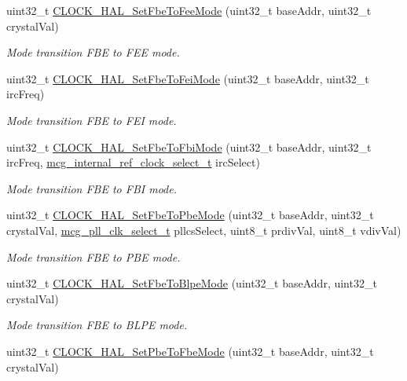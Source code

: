 \begin{DoxyCompactItemize}
uint32\+\_\+t \hyperlink{group__mcg__hal_gad92cb7d385dec217e4ec6f3ca8538fda}{C\+L\+O\+C\+K\+\_\+\+H\+A\+L\+\_\+\+Set\+Fbe\+To\+Fee\+Mode} (uint32\+\_\+t base\+Addr, uint32\+\_\+t crystal\+Val)
\begin{DoxyCompactList}\small\item\em Mode transition F\+BE to F\+EE mode. \end{DoxyCompactList}\item 
uint32\+\_\+t \hyperlink{group__mcg__hal_gaeb19584ea3baca6aef3b805ccc5485d1}{C\+L\+O\+C\+K\+\_\+\+H\+A\+L\+\_\+\+Set\+Fbe\+To\+Fei\+Mode} (uint32\+\_\+t base\+Addr, uint32\+\_\+t irc\+Freq)
\begin{DoxyCompactList}\small\item\em Mode transition F\+BE to F\+EI mode. \end{DoxyCompactList}\item 
uint32\+\_\+t \hyperlink{group__mcg__hal_ga26c8e4fcc5ae91b00683afe2cd6ac36e}{C\+L\+O\+C\+K\+\_\+\+H\+A\+L\+\_\+\+Set\+Fbe\+To\+Fbi\+Mode} (uint32\+\_\+t base\+Addr, uint32\+\_\+t irc\+Freq, \hyperlink{group__mcg__hal_ga9738d5cb312dacd7c75d2ed599ad48c7}{mcg\+\_\+internal\+\_\+ref\+\_\+clock\+\_\+select\+\_\+t} irc\+Select)
\begin{DoxyCompactList}\small\item\em Mode transition F\+BE to F\+BI mode. \end{DoxyCompactList}\item 
uint32\+\_\+t \hyperlink{group__mcg__hal_ga0f01df8b15a0d63a3b895333283f6a23}{C\+L\+O\+C\+K\+\_\+\+H\+A\+L\+\_\+\+Set\+Fbe\+To\+Pbe\+Mode} (uint32\+\_\+t base\+Addr, uint32\+\_\+t crystal\+Val, \hyperlink{group__mcg__hal_gabb093003f85a2f62fc0769b22daba84d}{mcg\+\_\+pll\+\_\+clk\+\_\+select\+\_\+t} pllcs\+Select, uint8\+\_\+t prdiv\+Val, uint8\+\_\+t vdiv\+Val)
\begin{DoxyCompactList}\small\item\em Mode transition F\+BE to P\+BE mode. \end{DoxyCompactList}\item 
uint32\+\_\+t \hyperlink{group__mcg__hal_ga6c47a37e2823a31f50e5ddaecb9b27a5}{C\+L\+O\+C\+K\+\_\+\+H\+A\+L\+\_\+\+Set\+Fbe\+To\+Blpe\+Mode} (uint32\+\_\+t base\+Addr, uint32\+\_\+t crystal\+Val)
\begin{DoxyCompactList}\small\item\em Mode transition F\+BE to B\+L\+PE mode. \end{DoxyCompactList}\item 
uint32\+\_\+t \hyperlink{group__mcg__hal_ga47cb268442cf109af3f910908a2f91bd}{C\+L\+O\+C\+K\+\_\+\+H\+A\+L\+\_\+\+Set\+Pbe\+To\+Fbe\+Mode} (uint32\+\_\+t base\+Addr, uint32\+\_\+t crystal\+Val)

\end{DoxyCompactItemize}
